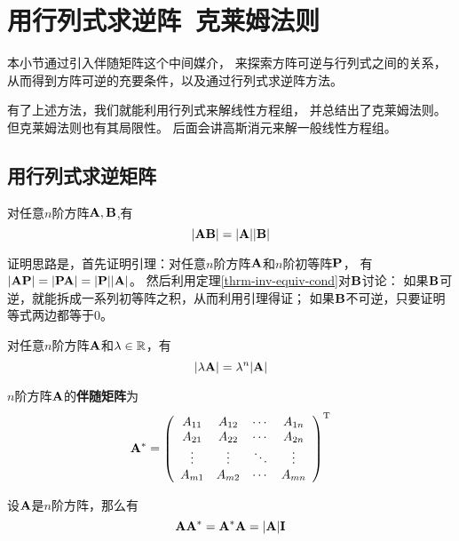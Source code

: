 \section{用行列式求逆阵\ 克莱姆法则}
本小节通过引入伴随矩阵这个中间媒介，
来探索方阵可逆与行列式之间的关系，
从而得到方阵可逆的充要条件，以及通过行列式求逆阵方法。

有了上述方法，我们就能利用行列式来解线性方程组，
并总结出了克莱姆法则。但克莱姆法则也有其局限性。
后面会讲高斯消元来解一般线性方程组。

\subsection{用行列式求逆矩阵}
\begin{theorem}[行列式乘法规则] \label{thrm-det-mul}
  对任意$n$阶方阵$\mmA,\mmB$,有
  \[ |\mmA\mmB|=|\mmA||\mmB| \]
\end{theorem}

\begin{remark}
  证明思路是，首先证明引理：对任意$n$阶方阵$\mmA$和$n$阶初等阵$\mmP$，
  有$|\mmA\mmP|=|\mmP\mmA|=|\mmP||\mmA|$。
  然后利用定理\ref{thrm-inv-equiv-cond}对$\mmB$讨论：
  如果$\mmB$可逆，就能拆成一系列初等阵之积，从而利用引理得证；
  如果$\mmB$不可逆，只要证明等式两边都等于0。
\end{remark}

\begin{theorem}[行列式数乘规则] \label{thrm-det-num-mul}
  对任意$n$阶方阵$\mmA$和$\lambda\in\mfR$，有
  \[ |\lambda\mmA| = \lambda^n|\mmA| \]
\end{theorem}

\begin{definition}[伴随矩阵]
  $n$阶方阵$\mmA$的\textbf{伴随矩阵}为
  \begin{displaymath}
    \mmA^* = \mmat{cccc}{
      A_{11} & A_{12} & \cdots & A_{1n} \\
      A_{21} & A_{22} & \cdots & A_{2n} \\
      \vdots & \vdots & \ddots & \vdots \\
      A_{m1} & A_{m2} & \cdots & A_{mn} }^\mT
  \end{displaymath}
\end{definition}

\begin{theorem}[伴随矩阵的性质] \label{thrm-adjugate-mat-prop}
  设$\mmA$是$n$阶方阵，那么有
  \[ \mmA\mmA^*=\mmA^*\mmA=|\mmA|\mmI \]
\end{theorem}

